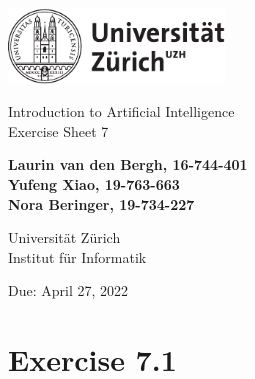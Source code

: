 \documentclass[12pt]{article}
\begin{document}
\begin{titlepage}
\includegraphics[height=20mm]{../images/uzh_logo}\\

\begin{flushleft}

\vspace{2cm}

{\Large Introduction to Artificial Intelligence\\Exercise Sheet 7}\\

\vspace{4cm}

\textbf{Laurin van den Bergh, 16-744-401\\Yufeng Xiao, 19-763-663\\Nora Beringer, 19-734-227}\\

\vspace{2cm}

Universität Zürich\\
Institut für Informatik

\vfill Due: April 27, 2022

\vspace{3cm}


\end{flushleft}
\end{titlepage}

\newpage

\section*{Exercise 7.1}
\end{document}

